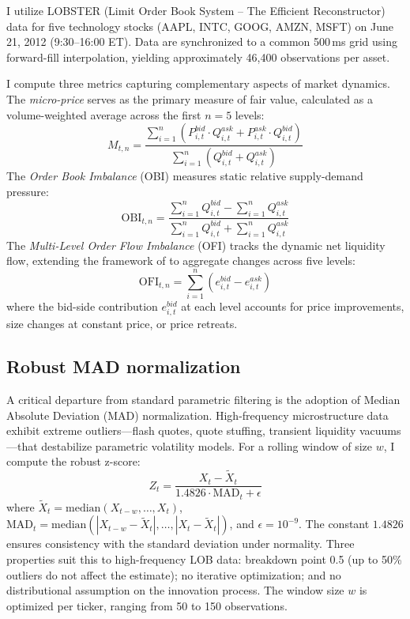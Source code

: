 \documentclass{article}
\begin{document}
I utilize LOBSTER (Limit Order Book System -- The Efficient Reconstructor)
data \parencite{lobster2019} for five technology stocks (AAPL, INTC, GOOG, AMZN,
MSFT) on June 21, 2012 (9:30--16:00 ET). Data are synchronized to a common
500\,ms grid using forward-fill interpolation, yielding approximately 46{,}400
observations per asset.

I compute three metrics capturing complementary aspects of market dynamics. The
\textit{micro-price} serves as the primary measure of fair value, calculated as
a volume-weighted average across the first $n=5$ levels:
\begin{equation}
M_{t,n} = \frac{\sum_{i=1}^{n} (P_{i,t}^{bid} \cdot Q_{i,t}^{ask} +
P_{i,t}^{ask} \cdot Q_{i,t}^{bid})}{\sum_{i=1}^{n} (Q_{i,t}^{bid} +
Q_{i,t}^{ask})}
\end{equation}
The \textit{Order Book Imbalance} (OBI) measures static relative supply-demand
pressure:
\begin{equation}
\text{OBI}_{t,n} = \frac{\sum_{i=1}^{n} Q_{i,t}^{bid} - \sum_{i=1}^{n}
Q_{i,t}^{ask}}{\sum_{i=1}^{n} Q_{i,t}^{bid} + \sum_{i=1}^{n} Q_{i,t}^{ask}}
\end{equation}
The \textit{Multi-Level Order Flow Imbalance} (OFI) tracks the dynamic net
liquidity flow, extending the framework of \textcite{cont2014price} to aggregate
changes across five levels:
\begin{equation}
\text{OFI}_{t,n} = \sum_{i=1}^{n} \left( e_{i,t}^{bid} - e_{i,t}^{ask} \right)
\end{equation}
where the bid-side contribution $e_{i,t}^{bid}$ at each level accounts for
price improvements, size changes at constant price, or price retreats.

\subsection{Robust MAD normalization}
\label{sec:mad}

A critical departure from standard parametric filtering is the adoption of
Median Absolute Deviation (MAD) normalization. High-frequency microstructure
data exhibit extreme outliers---flash quotes, quote stuffing, transient
liquidity vacuums---that destabilize parametric volatility models. For a
rolling window of size $w$, I compute the robust z-score:
\begin{equation}
Z_t = \frac{X_t - \widetilde{X}_t}{1.4826 \cdot \text{MAD}_t + \epsilon}
\end{equation}
where $\widetilde{X}_t = \text{median}(X_{t-w}, \ldots, X_t)$,
$\text{MAD}_t = \text{median}(|X_{t-w} - \widetilde{X}_t|, \ldots,
|X_t - \widetilde{X}_t|)$, and $\epsilon = 10^{-9}$. The constant $1.4826$
ensures consistency with the standard deviation under normality. Three
properties suit this to high-frequency LOB data: breakdown point 0.5 (up to
50\% outliers do not affect the estimate); no iterative optimization; and no
distributional assumption on the innovation process. The window size $w$ is
optimized per ticker, ranging from 50 to 150 observations.
\end{document}
